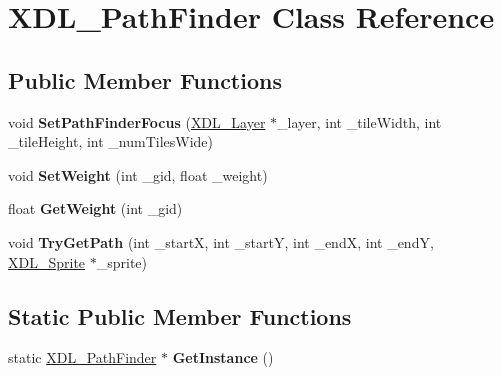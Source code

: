 \hypertarget{class_x_d_l___path_finder}{\section{X\-D\-L\-\_\-\-Path\-Finder Class Reference}
\label{class_x_d_l___path_finder}
}
\subsection*{Public Member Functions}
\begin{DoxyCompactItemize}
\item 
\hypertarget{class_x_d_l___path_finder_aae1ebca620ad8c1875b176419b49a8ff}{void {\bfseries Set\-Path\-Finder\-Focus} (\hyperlink{class_x_d_l___layer}{X\-D\-L\-\_\-\-Layer} $\ast$\-\_\-layer, int \-\_\-tile\-Width, int \-\_\-tile\-Height, int \-\_\-num\-Tiles\-Wide)}\label{class_x_d_l___path_finder_aae1ebca620ad8c1875b176419b49a8ff}

\item 
\hypertarget{class_x_d_l___path_finder_ae89492cd495ebda75e3823fc568b3318}{void {\bfseries Set\-Weight} (int \-\_\-gid, float \-\_\-weight)}\label{class_x_d_l___path_finder_ae89492cd495ebda75e3823fc568b3318}

\item 
\hypertarget{class_x_d_l___path_finder_ac303afb330b8f9f539cd2efe53fbf091}{float {\bfseries Get\-Weight} (int \-\_\-gid)}\label{class_x_d_l___path_finder_ac303afb330b8f9f539cd2efe53fbf091}

\item 
\hypertarget{class_x_d_l___path_finder_a240f6aa9544b77d7c9b21e2e84087656}{void {\bfseries Try\-Get\-Path} (int \-\_\-start\-X, int \-\_\-start\-Y, int \-\_\-end\-X, int \-\_\-end\-Y, \hyperlink{class_x_d_l___sprite}{X\-D\-L\-\_\-\-Sprite} $\ast$\-\_\-sprite)}\label{class_x_d_l___path_finder_a240f6aa9544b77d7c9b21e2e84087656}

\end{DoxyCompactItemize}
\subsection*{Static Public Member Functions}
\begin{DoxyCompactItemize}
\item 
\hypertarget{class_x_d_l___path_finder_a4a258141f72bd99535dd5ab64272a66f}{static \hyperlink{class_x_d_l___path_finder}{X\-D\-L\-\_\-\-Path\-Finder} $\ast$ {\bfseries Get\-Instance} ()}\label{class_x_d_l___path_finder_a4a258141f72bd99535dd5ab64272a66f}

\end{DoxyCompactItemize}
